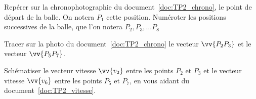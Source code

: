 

%

%



%
\mesure
Repérer sur la chronophotographie du document~\ref{doc:TP2_chrono}, le point de départ de la balle.
On notera $P_1$ cette position.
Numéroter les positions successives de la balle, que l'on notera $P_2, P_3, \ldots P_8$

%
\mesure
Tracer sur la photo du document~\ref{doc:TP2_chrono} le vecteur $\vv{P_2 P_3}$ et le vecteur $\vv{P_5 P_7}$.

%

%
\mesure
Schématiser le vecteur vitesse $\vv{v_2}$ entre les points $P_2$ et $P_3$ et le vecteur vitesse $\vv{v_6}$ entre les points $P_5$ et $P_7$, en vous aidant du document~\ref{doc:TP2_vitesse}.

%



% 
% 
% 
% 
% 
% 
